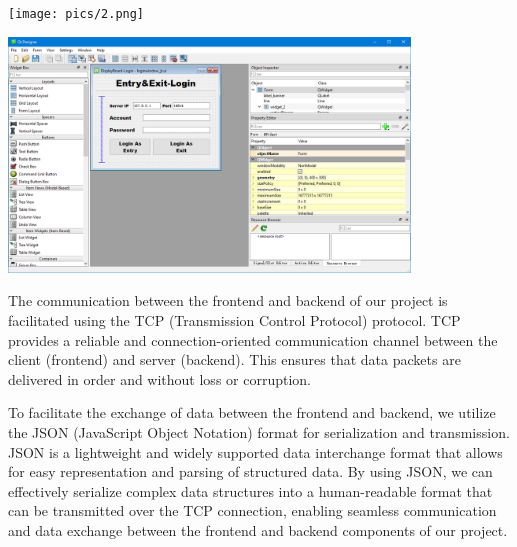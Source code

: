 {\begin{center}
  \centering
  \texttt{[image: pics/2.png]}
\end{center}

\begin{center}
  \centering
  \includegraphics[width=0.8\textwidth]{pics/3.png}
\end{center}

The communication between the frontend and backend of our project is
facilitated using the TCP (Transmission Control Protocol) protocol. TCP
provides a reliable and connection-oriented communication channel
between the client (frontend) and server (backend). This ensures that
data packets are delivered in order and without loss or corruption.

To facilitate the exchange of data between the frontend and backend, we
utilize the JSON (JavaScript Object Notation) format for serialization
and transmission. JSON is a lightweight and widely supported data
interchange format that allows for easy representation and parsing of
structured data. By using JSON, we can effectively serialize complex
data structures into a human-readable format that can be transmitted
over the TCP connection, enabling seamless communication and data
exchange between the frontend and backend components of our project.

}
